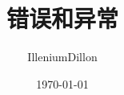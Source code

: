\documentclass[a4paper, 12pt]{article}
\begin{document}
\title{错误和异常}
\author{IlleniumDillon}
\date{\today}
\maketitle
\end{document}
